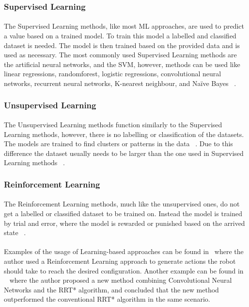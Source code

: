 \subsubsection{Supervised Learning}
\label{subsubsec:SL}
\paragraph{}The Supervised Learning methods, like most ML approaches, are used to predict a value based on a trained model. To train this model
a labelled and classified dataset is needed. The model is then trained based on the provided data and is used as necessary. The most 
commonly used Supervised Learning methods are the artificial neural networks, and the \gls{SVM}, however, 
methods can be used like linear regressions, randomforest, logistic regressions, convolutional neural networks, recurrent 
neural networks, K-nearest neighbour, and Naïve Bayes ~\cite{MLT1}.
\subsubsection{Unsupervised Learning}
\label{subsubsec:USL}
\paragraph{}The Unsupervised Learning methods function similarly to the Supervised Learning methods, however, 
there is no labelling or classification of the datasets. The models are trained to find clusters or patterns in the data ~\cite{USLT}.
Due to this difference the dataset usually needs to be larger than the one used in Supervised Learning methods ~\cite{MLT1}.
\subsubsection{Reinforcement Learning}
\label{subsubsec:RL}
\paragraph{}The Reinforcement Learning methods, much like the unsupervised ones, do not get a labelled or classified dataset to be trained 
on. Instead the model is trained by trial and error, where the model is rewarded or punished based on the arrived state ~\cite{RLT}.

\paragraph{}Examples of the usage of Learning-based approaches can be found in~\cite{RLEX1} where the author used a Reinforcement 
Learning approach to generate actions the robot should take to reach the desired configuration. Another example can be found in 
~\cite{MLEX2} where the author proposed a new method combining Convolutional Neural Networks and the RRT* algorithm, and concluded
 that the new method outperformed the conventional RRT* algorithm in the same scenario.

